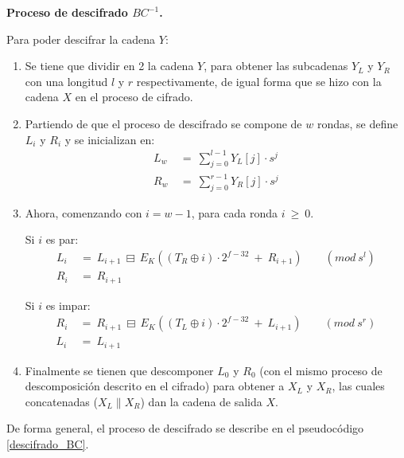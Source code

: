
\textbf{Proceso de descifrado $BC^{-1}$.}

Para poder descifrar la cadena $Y$:

\begin{enumerate}

  \item Se tiene que dividir en 2 la cadena $Y$, para obtener las subcadenas
    $Y_L$ y $Y_R$ con una longitud $l$ y $r$ respectivamente, de igual forma
    que se hizo con la cadena $X$ en el proceso de cifrado.

  \item Partiendo de que el proceso de descifrado se compone de $w$ rondas,
    se define $L_i$ y $R_i$ y se inicializan en:
    \begin{align}
      L_w\: &=\: \sum_{j=0}^{l-1} Y_L[j] \cdot s^j \\
      R_w\: &=\: \sum_{j=0}^{r-1} Y_R[j] \cdot s^j
    \end{align}

  \item Ahora, comenzando con $i=w-1$, para cada ronda $i\: \geq\: 0$.

    Si $i$ es par:
    \begin{align}
      L_i\: &=\: L_{i+1}\: \boxminus\:
                E_K((T_R \oplus i) \cdot 2^{f-32}\: +\: R_{i+1})\qquad
                (mod\ s^l) \\
      R_i\: &=\: R_{i+1}
    \end{align}

    Si $i$ es impar:
    \begin{align}
      R_i\: &=\: R_{i+1}\: \boxminus\:
                E_K((T_L \oplus i) \cdot 2^{f-32}\: +\: L_{i+1})\qquad
                (mod\ s^r) \\
      L_i\: &=\: L_{i+1}
    \end{align}

  \item Finalmente se tienen que descomponer $L_0$ y $R_0$ (con el mismo
    proceso de descomposición descrito en el cifrado) para obtener a $X_L$ y
    $X_R$, las cuales concatenadas ($X_L \parallel X_R$) dan la cadena de
    salida $X$.

\end{enumerate}

De forma general, el proceso de descifrado se describe en el pseudocódigo
\ref{descifrado_BC}.

